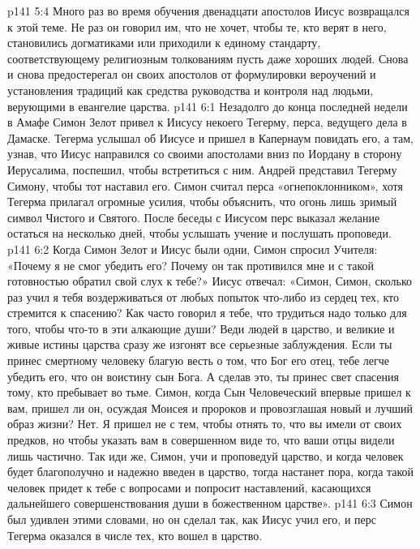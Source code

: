 \vs p141 5:4 Много раз во время обучения двенадцати апостолов Иисус возвращался к этой теме. Не раз он говорил им, что не хочет, чтобы те, кто верят в него, становились догматиками или приходили к единому стандарту, соответствующему религиозным толкованиям пусть даже хороших людей. Снова и снова предостерегал он своих апостолов от формулировки вероучений и установления традиций как средства руководства и контроля над людьми, верующими в евангелие царства.
\vs p141 6:1 Незадолго до конца последней недели в Амафе Симон Зелот привел к Иисусу некоего Тегерму, перса, ведущего дела в Дамаске. Тегерма услышал об Иисусе и пришел в Капернаум повидать его, а там, узнав, что Иисус направился со своими апостолами вниз по Иордану в сторону Иерусалима, поспешил, чтобы встретиться с ним. Андрей представил Тегерму Симону, чтобы тот наставил его. Симон считал перса «огнепоклонником», хотя Тегерма прилагал огромные усилия, чтобы объяснить, что огонь лишь зримый символ Чистого и Святого. После беседы с Иисусом перс выказал желание остаться на несколько дней, чтобы услышать учение и послушать проповеди.
\vs p141 6:2 Когда Симон Зелот и Иисус были одни, Симон спросил Учителя: «Почему я не смог убедить его? Почему он так противился мне и с такой готовностью обратил свой слух к тебе?» Иисус отвечал: «Симон, Симон, сколько раз учил я тебя воздерживаться от любых попыток  что\hyp{}либо из сердец тех, кто стремится к спасению? Как часто говорил я тебе, что трудиться надо только для того, чтобы  что\hyp{}то в эти алкающие души? Веди людей в царство, и великие и живые истины царства сразу же изгонят все серьезные заблуждения. Если ты принес смертному человеку благую весть о том, что Бог его отец, тебе легче убедить его, что он воистину сын Бога. А сделав это, ты принес свет спасения тому, кто пребывает во тьме. Симон, когда Сын Человеческий впервые пришел к вам, пришел ли он, осуждая Моисея и пророков и провозглашая новый и лучший образ жизни? Нет. Я пришел не с тем, чтобы отнять то, что вы имели от своих предков, но чтобы указать вам в совершенном виде то, что ваши отцы видели лишь частично. Так иди же, Симон, учи и проповедуй царство, и когда человек будет благополучно и надежно введен в царство, тогда настанет пора, когда такой человек придет к тебе с вопросами и попросит наставлений, касающихся дальнейшего совершенствования души в божественном царстве».
\vs p141 6:3 Симон был удивлен этими словами, но он сделал так, как Иисус учил его, и перс Тегерма оказался в числе тех, кто вошел в царство.
